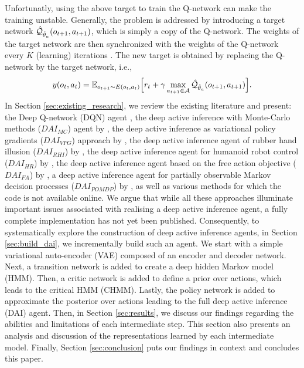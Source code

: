\documentclass[twoside,11pt]{article}
\let\oldmathcal\mathcal
\renewcommand{\mathcal}[1]{%
  \IfSubStr{ABCDEFGHIJKLMNOPQRSTUVWXYZ}{#1}{\oldmathcal{#1}}{\mathdutchcal{#1}}
}
\begin{document}
Unfortunatly, using the above target to train the Q-network can make the training unstable. Generally, the problem is addressed by introducing a target network $\hat{\mathcal{Q}}_{\hat{\theta}_a}(o_{t+1}, a_{t+1})$, which is simply a copy of the Q-network. The weights of the target network are then synchronized with the weights of the Q-network every $K$ (learning) iterations \citep{DeepRL}. The new target is obtained by replacing the Q-network by the target network, i.e.,
$$y(o_t,a_t) = \mathbb{E}_{o_{t+1} \sim E(o_t,a_t)}\Big[ r_t + \gamma \max_{a_{t+1} \in \mathcal{A}} \hat{\mathcal{Q}}_{\hat{\theta}_a}(o_{t+1}, a_{t+1})\Big].$$
In Section \ref{sec:existing_research}, we review the existing literature and present: the Deep Q-network (DQN) agent \citep{DeepRL}, the deep active inference with Monte-Carlo methods ($DAI_{MC}$) agent by \citet{DeepAIwithMCMC}, the deep active inference as variational policy gradients ($DAI_{VPG}$) approach by \citet{DeepAI}, the deep active inference agent of rubber hand illusion ($DAI_{RHI}$) by \citet{rood2020deep}, the deep active inference agent for humanoid robot control ($DAI_{HR}$) by \citet{sancaktar2020endtoend,DAI_HR,DAI_HR2}, the deep active inference agent based on the free action objective ($DAI_{FA}$) by \citet{DAI_Kai}, a deep active inference agent for partially observable Markov decision processes ($DAI_{POMDP}$) by \citet{DAI_POMDP}, as well as various methods for which the code is not available online. We argue that while all these approaches illuminate important issues associated with realising a deep active inference agent, a fully complete implementation has not yet been published. Consequently, to systematically explore the construction of deep active inference agents, in Section \ref{sec:build_dai}, we incrementally build such an agent. We start with a simple variational auto-encoder (VAE) composed of an encoder and decoder network. Next, a transition network is added to create a deep hidden Markov model (HMM). Then, a critic network is added to define a prior over actions, which leads to the critical HMM (CHMM). Lastly, the policy network is added to approximate the posterior over actions leading to the full deep active inference (DAI) agent. Then, in Section \ref{sec:results}, we discuss our findings regarding the abilities and limitations of each intermediate step. This section also presents an analysis and discussion of the representations learned by each intermediate model. Finally, Section \ref{sec:conclusion} puts our findings in context and concludes this paper.
\end{document}
